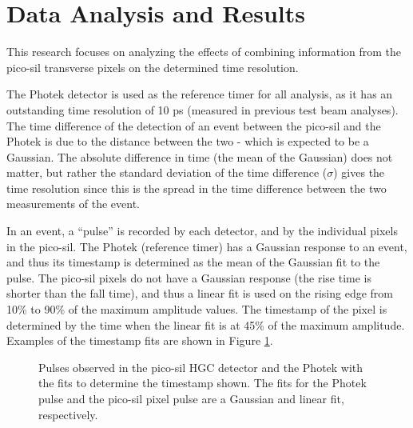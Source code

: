 \documentclass[twocolumn,aps,prd,reprint]{revtex4-1}
\begin{document}
\section{Data Analysis and Results}

This research focuses on analyzing the effects of combining information from the pico-sil transverse pixels on the determined time resolution.

The Photek detector is used as the reference timer for all analysis, as it has an outstanding time resolution of 10 ps (measured in previous test beam analyses). The time difference of the detection of an event between the pico-sil and the Photek is due to the distance between the two - which is expected to be a Gaussian. The absolute difference in time (the mean of the Gaussian) does not matter, but rather the standard deviation of the time difference ($\sigma$) gives the time resolution since this is the spread in the time difference between the two measurements of the event.

In an event, a ``pulse'' is recorded by each detector, and by the individual pixels in the pico-sil. The Photek (reference timer) has a Gaussian response to an event, and thus its timestamp is determined as the mean of the Gaussian fit to the pulse. The pico-sil pixels do not have a Gaussian response (the rise time is shorter than the fall time), and thus a linear fit is used on the rising edge from 10\% to 90\% of the maximum amplitude values. The timestamp of the pixel is determined by the time when the linear fit is at 45\% of the maximum amplitude. Examples of the timestamp fits are shown in Figure \ref{timestamp}.

\begin{figure}[!htbp]
\caption{Pulses observed in the pico-sil HGC detector and the Photek with the fits to determine the timestamp shown. The fits for the Photek pulse and the pico-sil pixel pulse are a Gaussian and linear fit, respectively.}
\label{timestamp}
\end{figure}
\end{document}
